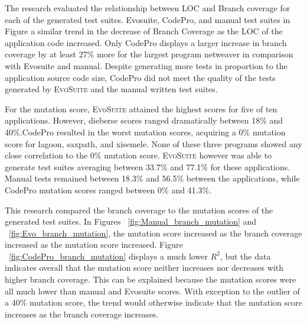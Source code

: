 The research evaluated the relationship between LOC and Branch coverage for each of the generated test suites. Evosuite, CodePro, and manual test suites in Figure a similar trend in the decrease of Branch Coverage as the LOC of the application code increased. Only CodePro displays a larger increase in branch coverage by at least 27\%  more for the largest program netweaver in comparison with Evosuite and manual. Despite generating more tests in proportion to the application source code size,  CodePro did not meet the quality of the tests generated by \textsc{EvoSuite} and the manual written test suites.

For the mutation score, \textsc{EvoSuite} attained the highest scores for five of ten applications. However, dieberse scores ranged dramatically between 18\% and 40\%.CodePro resulted in the worst mutation scores, acquiring a  0\% mutation score for lagoon, saxpath, and xisemele. None of these three programs showed any close correlation to the 0\% mutation score. \textsc{EvoSuite} however was able to generate test suites averaging between 33.7\% and 77.1\% for these applications. Manual tests remained between 18.3\% and 56.5\%  between the applications, while CodePro mutation scores ranged between 0\% and 41.3\%. 

This research compared the branch coverage to the mutation scores of the generated test suites. In Figures ~\ref{fig:Manual_branch_mutation} and ~\ref{fig:Evo_branch_mutation}, the mutation score increased as the branch coverage increased as the mutation score increased.  Figure ~\ref{fig:CodePro_branch_mutation} displays a much lower $R^2$, but the data indicates overall that the mutation score neither increases nor decreases with higher branch coverage. This can be explained because the mutation scores were all much lower than manual and Evosuite scores. With exception to the outlier of a 40\% mutation score, the trend would otherwise indicate that the mutation score increases as the branch coverage increases. 




